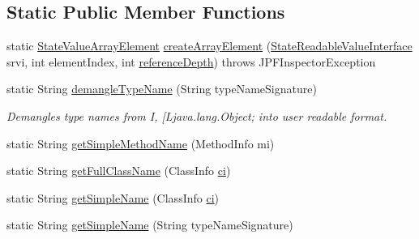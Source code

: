 \subsection*{Static Public Member Functions}
\begin{DoxyCompactItemize}
\item 
static \hyperlink{classgov_1_1nasa_1_1jpf_1_1inspector_1_1server_1_1programstate_1_1_state_value_array_element}{State\+Value\+Array\+Element} \hyperlink{classgov_1_1nasa_1_1jpf_1_1inspector_1_1server_1_1programstate_1_1_state_value_array_element_abbf66bd42dd450e71db0e825cd2c469e}{create\+Array\+Element} (\hyperlink{interfacegov_1_1nasa_1_1jpf_1_1inspector_1_1server_1_1programstate_1_1_state_readable_value_interface}{State\+Readable\+Value\+Interface} srvi, int element\+Index, int \hyperlink{classgov_1_1nasa_1_1jpf_1_1inspector_1_1server_1_1programstate_1_1_state_node_a55683618625dae46e8aa68d95811d6bb}{reference\+Depth})  throws J\+P\+F\+Inspector\+Exception 
\item 
static String \hyperlink{classgov_1_1nasa_1_1jpf_1_1inspector_1_1server_1_1programstate_1_1_state_value_a4b2af88402e04430a98ebadbd98a5c67}{demangle\+Type\+Name} (String type\+Name\+Signature)
\begin{DoxyCompactList}\small\item\em Demangles type names from I, \mbox{[}Ljava.\+lang.\+Object; into user readable format. \end{DoxyCompactList}\item 
static String \hyperlink{classgov_1_1nasa_1_1jpf_1_1inspector_1_1server_1_1programstate_1_1_state_value_a7d810b593e21df3baabf5b13e473b152}{get\+Simple\+Method\+Name} (Method\+Info mi)
\item 
static String \hyperlink{classgov_1_1nasa_1_1jpf_1_1inspector_1_1server_1_1programstate_1_1_state_value_ab6efcb01d11093b4d9de33a220d0f204}{get\+Full\+Class\+Name} (Class\+Info \hyperlink{classgov_1_1nasa_1_1jpf_1_1inspector_1_1server_1_1programstate_1_1_state_value_a0eb4aa1e630ed6372dcfb8c41ae7edc5}{ci})
\item 
static String \hyperlink{classgov_1_1nasa_1_1jpf_1_1inspector_1_1server_1_1programstate_1_1_state_value_ad0fa5ab42fdeea38ce4fec44451ef680}{get\+Simple\+Name} (Class\+Info \hyperlink{classgov_1_1nasa_1_1jpf_1_1inspector_1_1server_1_1programstate_1_1_state_value_a0eb4aa1e630ed6372dcfb8c41ae7edc5}{ci})
\item 
static String \hyperlink{classgov_1_1nasa_1_1jpf_1_1inspector_1_1server_1_1programstate_1_1_state_value_a160cb94910e40bb87a81018116c92c09}{get\+Simple\+Name} (String type\+Name\+Signature)

\end{DoxyCompactItemize}
